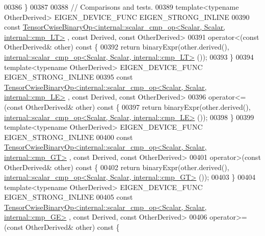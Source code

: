 \begin{DoxyCode}
00386     \}
00387 
00388     \textcolor{comment}{// Comparisons and tests.}
00389     \textcolor{keyword}{template}<\textcolor{keyword}{typename} OtherDerived> EIGEN\_DEVICE\_FUNC EIGEN\_STRONG\_INLINE
00390     \textcolor{keyword}{const} 
      \hyperlink{class_eigen_1_1_tensor_cwise_binary_op}{TensorCwiseBinaryOp<internal::scalar\_cmp\_op<Scalar, Scalar, internal::cmp\_LT>}
      , \textcolor{keyword}{const} Derived, \textcolor{keyword}{const} OtherDerived>
00391     operator<(\textcolor{keyword}{const} OtherDerived& other)\textcolor{keyword}{ const }\{
00392       \textcolor{keywordflow}{return} binaryExpr(other.derived(), 
      \hyperlink{struct_eigen_1_1internal_1_1scalar__cmp__op}{internal::scalar\_cmp\_op<Scalar, Scalar, internal::cmp\_LT>}
      ());
00393     \}
00394     \textcolor{keyword}{template}<\textcolor{keyword}{typename} OtherDerived> EIGEN\_DEVICE\_FUNC EIGEN\_STRONG\_INLINE
00395     \textcolor{keyword}{const} 
      \hyperlink{class_eigen_1_1_tensor_cwise_binary_op}{TensorCwiseBinaryOp<internal::scalar\_cmp\_op<Scalar, Scalar, internal::cmp\_LE>}
      , \textcolor{keyword}{const} Derived, \textcolor{keyword}{const} OtherDerived>
00396     operator<=(\textcolor{keyword}{const} OtherDerived& other)\textcolor{keyword}{ const }\{
00397       \textcolor{keywordflow}{return} binaryExpr(other.derived(), 
      \hyperlink{struct_eigen_1_1internal_1_1scalar__cmp__op}{internal::scalar\_cmp\_op<Scalar, Scalar, internal::cmp\_LE>}
      ());
00398     \}
00399     \textcolor{keyword}{template}<\textcolor{keyword}{typename} OtherDerived> EIGEN\_DEVICE\_FUNC EIGEN\_STRONG\_INLINE
00400     \textcolor{keyword}{const} 
      \hyperlink{class_eigen_1_1_tensor_cwise_binary_op}{TensorCwiseBinaryOp<internal::scalar\_cmp\_op<Scalar, Scalar, internal::cmp\_GT>}
      , \textcolor{keyword}{const} Derived, \textcolor{keyword}{const} OtherDerived>
00401     operator>(\textcolor{keyword}{const} OtherDerived& other)\textcolor{keyword}{ const }\{
00402       \textcolor{keywordflow}{return} binaryExpr(other.derived(), 
      \hyperlink{struct_eigen_1_1internal_1_1scalar__cmp__op}{internal::scalar\_cmp\_op<Scalar, Scalar, internal::cmp\_GT>}
      ());
00403     \}
00404     \textcolor{keyword}{template}<\textcolor{keyword}{typename} OtherDerived> EIGEN\_DEVICE\_FUNC EIGEN\_STRONG\_INLINE
00405     \textcolor{keyword}{const} 
      \hyperlink{class_eigen_1_1_tensor_cwise_binary_op}{TensorCwiseBinaryOp<internal::scalar\_cmp\_op<Scalar, Scalar, internal::cmp\_GE>}
      , \textcolor{keyword}{const} Derived, \textcolor{keyword}{const} OtherDerived>
00406     operator>=(\textcolor{keyword}{const} OtherDerived& other)\textcolor{keyword}{ const }\{

\end{DoxyCode}
